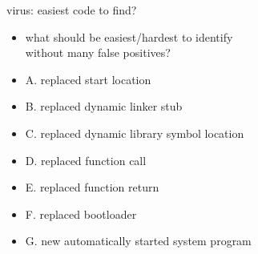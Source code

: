 \begin{frame}{virus: easiest code to find?}
    \begin{itemize}
    \item what should be easiest/hardest to identify \\
        without many false positives?
        \item A. replaced start location
        \item B. replaced dynamic linker stub
        \item C. replaced dynamic library symbol location
        \item D. replaced function call
        \item E. replaced function return
        \item F. replaced bootloader
        \item G. new automatically started system program
    \end{itemize}
\end{frame}


